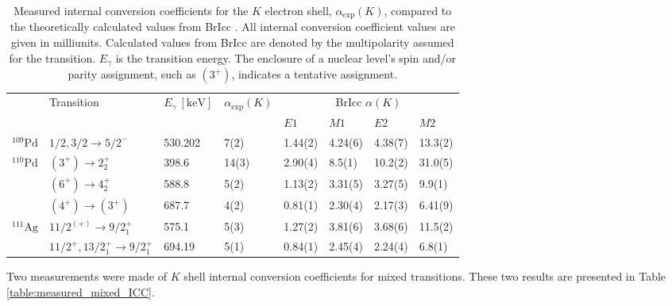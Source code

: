 \begin{table}
  \begin{center}
    \begin{tabular}{|l|l l|l|l l l l|} 
     \hline
     & Transition & $E_\gamma \ [\mathrm{keV}]$ & $\alpha_\mathrm{exp}(K)$ & \multicolumn{4}{c|}{BrIcc $\alpha(K)$} \\
     & \multicolumn{2}{c|}{} &  										& $E1$		& $M1$		& $E2$		& $M2$		\\  
     \hline 
     $^{109}\mathrm{Pd}$ & $1/2, 3/2 \rightarrow 5/2^-$ 			& 530.202 	& 7(2)	& 1.44(2)	& 4.24(6)	& 4.38(7)	& 13.3(2)	\\ 
     \hline 
     $^{110}\mathrm{Pd}$ & $(3^+) \rightarrow 2^+_2$ 				& 398.6   	& 14(3) & 2.90(4)	& 8.5(1) 	& 10.2(2) 	& 31.0(5) 	\\  
                         & $(6^+) \rightarrow 4^+_2$ 				& 588.8   	& 5(2) 	& 1.13(2) 	& 3.31(5) 	& 3.27(5) 	& 9.9(1)	\\ 
                         & $(4^+) \rightarrow (3^+)$ 				& 687.7   	& 4(2) 	& 0.81(1)	& 2.30(4) 	& 2.17(3)	& 6.41(9) 	\\    
     \hline 
     $^{111}\mathrm{Ag}$ & $11/2^{(+)} \rightarrow 9/2^+_1$ 		& 575.1 	& 5(3)& 1.27(2)	& 3.81(6)	& 3.68(6)	& 11.5(2)	\\  
                         & $11/2^+, 13/2_1^+ \rightarrow 9/2_1^+$ 	& 694.19    & 5(1)& 0.84(1) 	& 2.45(4) 	& 2.24(4) 	& 6.8(1)	\\  
     \hline
    \end{tabular}
  \end{center}
  \caption[Measured internal conversion coefficients for the $K$ electron shell, $\alpha_\mathrm{exp}(K)$, compared to the theoretically calculated values from BrIcc \cite{KIBEDI2008202}.]{Measured internal conversion coefficients for the $K$ electron shell, $\alpha_\mathrm{exp}(K)$, compared to the theoretically calculated values from BrIcc \cite{KIBEDI2008202}. All internal conversion coefficient values are given in milliunits. Calculated values from BrIcc are denoted by the multipolarity assumed for the transition. $E_\gamma$ is the transition energy. The enclosure of a nuclear level's spin and/or parity assignment, such as $(3^+)$, indicates a tentative assignment.}
  \label{table:measured_ICC}
\end{table}

Two measurements were made of $K$ shell internal conversion coefficients for mixed transitions. These two results are presented in Table \ref{table:measured_mixed_ICC}.


